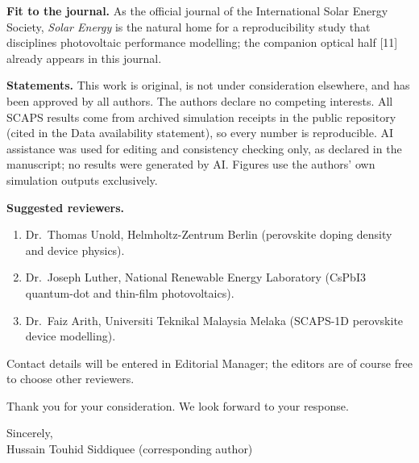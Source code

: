 \documentclass[11pt,a4paper]{article}
\begin{document}
\textbf{Fit to the journal.} As the official journal of the International Solar Energy Society, \textit{Solar Energy} is the natural home for a reproducibility study that disciplines photovoltaic performance modelling; the companion optical half [11] already appears in this journal.

\textbf{Statements.} This work is original, is not under consideration elsewhere, and has been approved by all authors. The authors declare no competing interests. All SCAPS results come from archived simulation receipts in the public repository (cited in the Data availability statement), so every number is reproducible. AI assistance was used for editing and consistency checking only, as declared in the manuscript; no results were generated by AI. Figures use the authors' own simulation outputs exclusively.

\textbf{Suggested reviewers.}
\begin{enumerate}
\item Dr.\ Thomas Unold, Helmholtz-Zentrum Berlin (perovskite doping density and device physics).
\item Dr.\ Joseph Luther, National Renewable Energy Laboratory (CsPbI3 quantum-dot and thin-film photovoltaics).
\item Dr.\ Faiz Arith, Universiti Teknikal Malaysia Melaka (SCAPS-1D perovskite device modelling).
\end{enumerate}
Contact details will be entered in Editorial Manager; the editors are of course free to choose other reviewers.

Thank you for your consideration. We look forward to your response.

\vspace{2em}
\noindent Sincerely,\\
Hussain Touhid Siddiquee (corresponding author)
\end{document}
